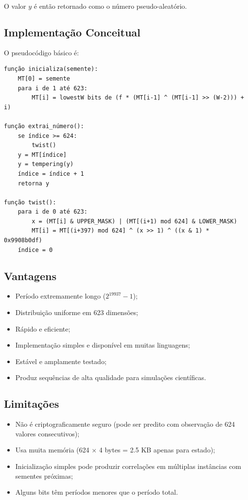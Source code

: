\documentclass[12pt,a4paper]{article}
\begin{document}
O valor $y$ é então retornado como o número pseudo-aleatório.

\subsection{Implementação Conceitual}

O pseudocódigo básico é:

\begin{verbatim}
função inicializa(semente):
    MT[0] = semente
    para i de 1 até 623:
        MT[i] = lowestW bits de (f * (MT[i-1] ^ (MT[i-1] >> (W-2))) + i)

função extrai_número():
    se índice >= 624:
        twist()
    y = MT[índice]
    y = tempering(y)
    índice = índice + 1
    retorna y

função twist():
    para i de 0 até 623:
        x = (MT[i] & UPPER_MASK) | (MT[(i+1) mod 624] & LOWER_MASK)
        MT[i] = MT[(i+397) mod 624] ^ (x >> 1) ^ ((x & 1) * 0x9908b0df)
    índice = 0
\end{verbatim}

\subsection{Vantagens}

\begin{itemize}
    \item Período extremamente longo ($2^{19937} - 1$);
    \item Distribuição uniforme em 623 dimensões;
    \item Rápido e eficiente;
    \item Implementação simples e disponível em muitas linguagens;
    \item Estável e amplamente testado;
    \item Produz sequências de alta qualidade para simulações científicas.
\end{itemize}

\subsection{Limitações}

\begin{itemize}
    \item Não é criptograficamente seguro (pode ser predito com observação de 624 valores consecutivos);
    \item Usa muita memória (624 × 4 bytes = 2.5 KB apenas para estado);
    \item Inicialização simples pode produzir correlações em múltiplas instâncias com sementes próximas;
    \item Alguns bits têm períodos menores que o período total.
\end{itemize}
\end{document}
